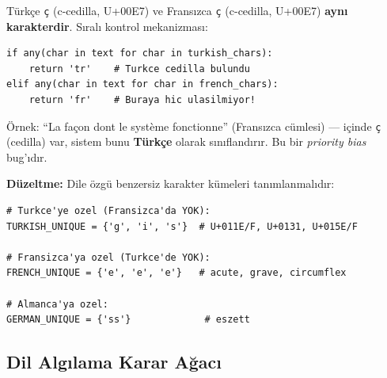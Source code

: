 \begin{dikkat}
T\"{u}rk\c{c}e \texttt{\c{c}} (c-cedilla, U+00E7) ve Frans{\i}zca \texttt{\c{c}} (c-cedilla, U+00E7) \textbf{ayn{\i} karakterdir}. S{\i}ral{\i} kontrol mekanizmas{\i}:
\begin{lstlisting}
if any(char in text for char in turkish_chars):
    return 'tr'    # Turkce cedilla bulundu
elif any(char in text for char in french_chars):
    return 'fr'    # Buraya hic ulasilmiyor!
\end{lstlisting}
\"{O}rnek: ``La fa\c{c}on dont le syst\`{e}me fonctionne'' (Frans{\i}zca c\"{u}mlesi) --- i\c{c}inde \texttt{\c{c}} (cedilla) var, sistem bunu \textbf{T\"{u}rk\c{c}e} olarak s{\i}n{\i}fland{\i}r{\i}r. Bu bir \emph{priority bias} bug'{\i}d{\i}r.

\textbf{D\"{u}zeltme:} Dile \"{o}zg\"{u} benzersiz karakter k\"{u}meleri tan{\i}mlanmal{\i}d{\i}r:
\begin{lstlisting}
# Turkce'ye ozel (Fransizca'da YOK):
TURKISH_UNIQUE = {'g', 'i', 's'}  # U+011E/F, U+0131, U+015E/F

# Fransizca'ya ozel (Turkce'de YOK):
FRENCH_UNIQUE = {'e', 'e', 'e'}   # acute, grave, circumflex

# Almanca'ya ozel:
GERMAN_UNIQUE = {'ss'}             # eszett
\end{lstlisting}
\end{dikkat}

\subsection{Dil Alg{\i}lama Karar A\u{g}ac{\i}}

